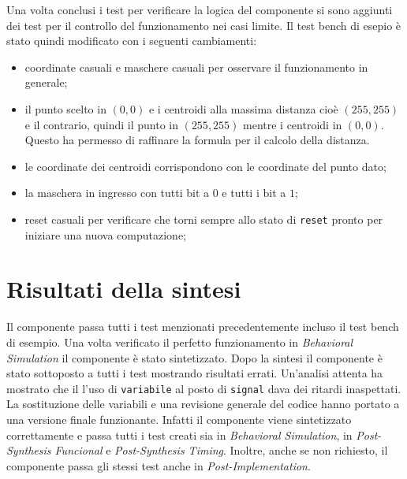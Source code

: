 \documentclass{article}
\begin{document}
Una volta conclusi i test per verificare la logica del componente si sono aggiunti dei test per il controllo del funzionamento nei casi limite. Il test bench di esepio \`{e} stato quindi modificato con i seguenti cambiamenti:
\begin{itemize}
	\item coordinate casuali e maschere casuali per osservare il funzionamento in generale;
	\item il punto scelto in $(0,0)$ e i centroidi alla massima distanza cio\`{e} $(255,255)$ e il contrario, quindi il punto in $(255,255)$ mentre i centroidi in $(0,0)$. Questo ha permesso di raffinare la formula per il calcolo della distanza.
	\item le coordinate dei centroidi corrispondono con le coordinate del punto dato;
	\item la maschera in ingresso con tutti bit a $0$ e tutti i bit a $1$;
	\item reset casuali per verificare che torni sempre allo stato di \texttt{reset} pronto per iniziare una nuova computazione;	
\end{itemize}




\section{Risultati della sintesi}
Il componente passa tutti i test menzionati precedentemente incluso il test bench di esempio. Una volta verificato il perfetto funzionamento in \textit{Behavioral Simulation} il componente \`{e} stato sintetizzato. Dopo la sintesi il componente \`{e} stato sottoposto a tutti i test mostrando risultati errati. Un'analisi attenta ha mostrato che il l'uso di \texttt{variabile} al posto di \texttt{signal} dava dei ritardi inaspettati. La sostituzione delle variabili e una revisione generale del codice hanno portato a una versione finale funzionante. Infatti il componente viene sintetizzato correttamente e passa tutti i test creati sia in \textit{Behavioral Simulation}, in \textit{Post-Synthesis Funcional} e \textit{Post-Synthesis Timing}. Inoltre, anche se non richiesto, il componente passa gli stessi test anche in \textit{Post-Implementation}.

\pagebreak


 
\pagebreak
\end{document}
